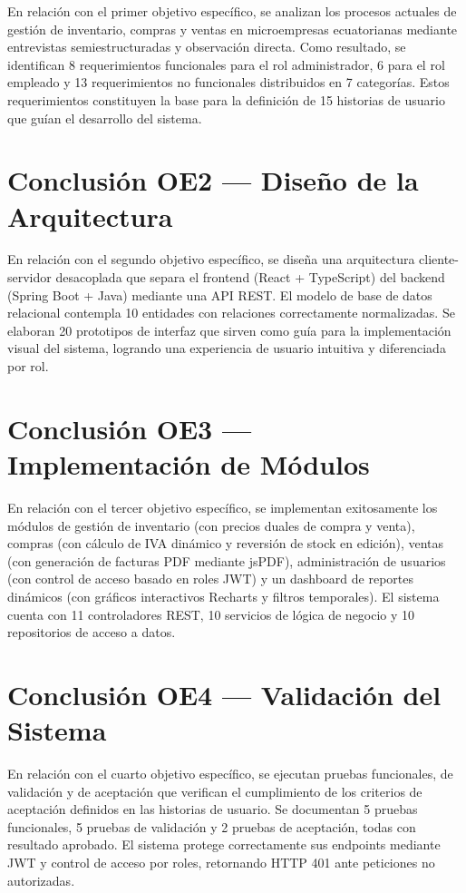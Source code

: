 \documentclass[12pt, letterpaper]{report}
\begin{document}
En relación con el primer objetivo específico, se analizan los procesos actuales de gestión de inventario, compras y ventas en microempresas ecuatorianas mediante entrevistas semiestructuradas y observación directa. Como resultado, se identifican 8 requerimientos funcionales para el rol administrador, 6 para el rol empleado y 13 requerimientos no funcionales distribuidos en 7 categorías. Estos requerimientos constituyen la base para la definición de 15 historias de usuario que guían el desarrollo del sistema.

\section{Conclusión OE2 --- Diseño de la Arquitectura}

En relación con el segundo objetivo específico, se diseña una arquitectura cliente-servidor desacoplada que separa el frontend (React + TypeScript) del backend (Spring Boot + Java) mediante una API REST. El modelo de base de datos relacional contempla 10 entidades con relaciones correctamente normalizadas. Se elaboran 20 prototipos de interfaz que sirven como guía para la implementación visual del sistema, logrando una experiencia de usuario intuitiva y diferenciada por rol.

\section{Conclusión OE3 --- Implementación de Módulos}

En relación con el tercer objetivo específico, se implementan exitosamente los módulos de gestión de inventario (con precios duales de compra y venta), compras (con cálculo de IVA dinámico y reversión de stock en edición), ventas (con generación de facturas PDF mediante jsPDF), administración de usuarios (con control de acceso basado en roles JWT) y un dashboard de reportes dinámicos (con gráficos interactivos Recharts y filtros temporales). El sistema cuenta con 11 controladores REST, 10 servicios de lógica de negocio y 10 repositorios de acceso a datos.

\section{Conclusión OE4 --- Validación del Sistema}

En relación con el cuarto objetivo específico, se ejecutan pruebas funcionales, de validación y de aceptación que verifican el cumplimiento de los criterios de aceptación definidos en las historias de usuario. Se documentan 5 pruebas funcionales, 5 pruebas de validación y 2 pruebas de aceptación, todas con resultado aprobado. El sistema protege correctamente sus endpoints mediante JWT y control de acceso por roles, retornando HTTP 401 ante peticiones no autorizadas.
\end{document}
